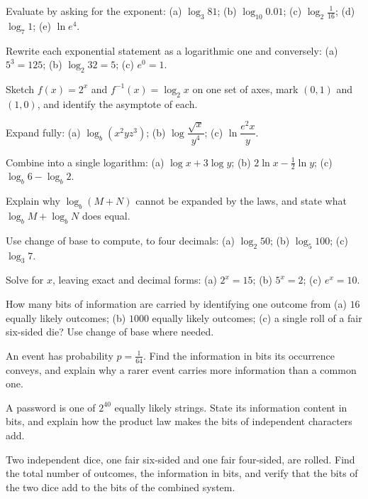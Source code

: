 \documentclass[12pt]{book}
\begin{document}
\begin{exercises}
\item Evaluate by asking for the exponent: (a) $\log_3 81$; (b) $\log_{10}0.01$;
(c) $\log_2\tfrac1{16}$; (d) $\log_7 1$; (e) $\ln e^{4}$.

\item Rewrite each exponential statement as a logarithmic one and conversely:
(a) $5^{3}=125$; (b) $\log_2 32=5$; (c) $e^{0}=1$.

\item Sketch $f(x)=2^{x}$ and $f^{-1}(x)=\log_2 x$ on one set of axes, mark
$(0,1)$ and $(1,0)$, and identify the asymptote of each.

\item Expand fully: (a) $\log_b(x^{2}yz^{3})$; (b) $\log\dfrac{\sqrt{x}}{y^{4}}$;
(c) $\ln\dfrac{e^{2}x}{y}$.

\item Combine into a single logarithm: (a) $\log x+3\log y$;
(b) $2\ln x-\tfrac12\ln y$; (c) $\log_b 6-\log_b 2$.

\item Explain why $\log_b(M+N)$ cannot be expanded by the laws, and state what
$\log_b M+\log_b N$ does equal.

\item Use change of base to compute, to four decimals: (a) $\log_2 50$;
(b) $\log_5 100$; (c) $\log_3 7$.

\item Solve for $x$, leaving exact and decimal forms: (a) $2^{x}=15$;
(b) $5^{x}=2$; (c) $e^{x}=10$.

\item How many bits of information are carried by identifying one outcome from
(a) $16$ equally likely outcomes; (b) $1000$ equally likely outcomes;
(c) a single roll of a fair six-sided die? Use change of base where needed.

\item An event has probability $p=\tfrac1{64}$. Find the information in bits its
occurrence conveys, and explain why a rarer event carries more information than a
common one.

\item A password is one of $2^{40}$ equally likely strings. State its information
content in bits, and explain how the product law makes the bits of independent
characters add.

\item Two independent dice, one fair six-sided and one fair four-sided, are rolled.
Find the total number of outcomes, the information in bits, and verify that the bits
of the two dice add to the bits of the combined system.
\end{exercises}
\end{document}
